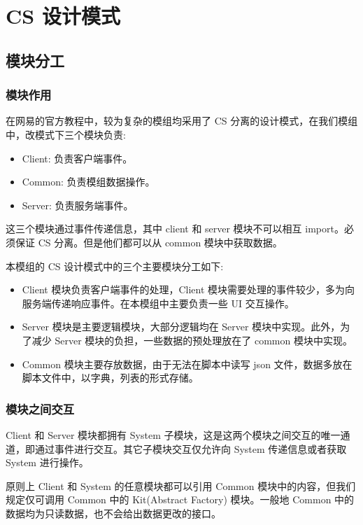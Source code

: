 \section{CS 设计模式}

\subsection{模块分工}

\subsubsection{模块作用}

在网易的官方教程中，较为复杂的模组均采用了 CS 分离的设计模式，在我们模组中，改模式下三个模块负责:
\begin{itemize}
    \item Client: 负责客户端事件。
    \item Common: 负责模组数据操作。
    \item Server: 负责服务端事件。
\end{itemize}

这三个模块通过事件传递信息，其中 client 和 server 模块不可以相互 import。必须保证 CS 分离。但是他们都可以从 common 模块中获取数据。

本模组的 CS 设计模式中的三个主要模块分工如下:
\begin{itemize}
    \item Client 模块负责客户端事件的处理，Client 模块需要处理的事件较少，多为向服务端传递响应事件。在本模组中主要负责一些 UI 交互操作。
    \item Server 模块是主要逻辑模块，大部分逻辑均在 Server 模块中实现。此外，为了减少 Server 模块的负担，一些数据的预处理放在了 common 模块中实现。
    \item Common 模块主要存放数据，由于无法在脚本中读写 json 文件，数据多放在脚本文件中，以字典，列表的形式存储。
\end{itemize}

\subsubsection{模块之间交互}

Client 和 Server 模块都拥有 System 子模块，这是这两个模块之间交互的唯一通道，即通过事件进行交互。其它子模块交互仅允许向 System 传递信息或者获取 System 进行操作。

原则上 Client 和 System 的任意模块都可以引用 Common 模块中的内容，但我们规定仅可调用 Common 中的 Kit(Abstract Factory) 模块。一般地 Common 中的数据均为只读数据，也不会给出数据更改的接口。

